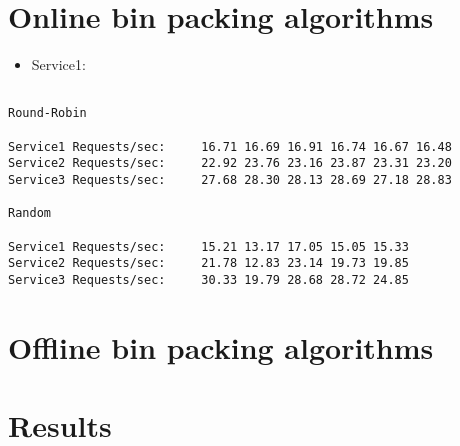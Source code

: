 \section{Online bin packing algorithms}

\begin{itemize}
\item{Service1: }
\end{itemize}

\begin{verbatim}

Round-Robin

Service1 Requests/sec:     16.71 16.69 16.91 16.74 16.67 16.48
Service2 Requests/sec:     22.92 23.76 23.16 23.87 23.31 23.20
Service3 Requests/sec:     27.68 28.30 28.13 28.69 27.18 28.83

Random

Service1 Requests/sec:     15.21 13.17 17.05 15.05 15.33
Service2 Requests/sec:     21.78 12.83 23.14 19.73 19.85
Service3 Requests/sec:     30.33 19.79 28.68 28.72 24.85

\end{verbatim}


\section{Offline bin packing algorithms}
\section{Results}


